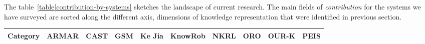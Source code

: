 \documentclass{IEEEtran}
\begin{document}
The table~\ref{table|contribution-by-systems} sketches the landscape of current
research. The main fields of \emph{contribution} for the systems we have
surveyed are sorted along the different axis, dimensions of knowledge
representation that were identified in previous section.

\begin{landscape}
\begin{table}\tiny
\begin{center}
\begin{tabular}{p{0.2cm}p{3.4cm}p{1.6cm}p{1.3cm}p{1.7cm}p{1.5cm}p{2cm}p{2cm}p{2cm}p{1.4cm}p{1.8cm}}
\toprule
\multicolumn{2}{c}{\bf Category}                                                     & ARMAR \cite{Holzapfel2008}& CAST \cite{Hawes2007}       & GSM \cite{Mavridis2006}     & {\sc Ke Jia} \cite{Chen2010}& {\sc KnowRob} \cite{Tenorth2009a}  & NKRL \cite{Sabri2011}                           & ORO \cite{Lemaignan2010}                      & OUR-K \cite{Lim2011}          & PEIS \cite{Daoutis2009}        \\
                                                                                                                                                                                                                                                                                                                                                                                                                   
\midrule                                                                                                                                                                                                                                                                                                                                                                                                           
                                                                                                                                                                                                                                                                                                                                                                                                                   

\end{tabular}
\end{center}
\end{table}
\end{landscape}
\end{document}
